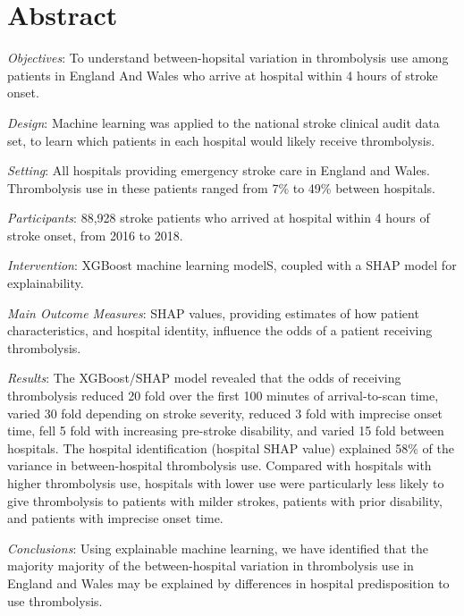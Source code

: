 \section*{Abstract}

\emph{Objectives}: To understand between-hopsital variation in thrombolysis use among patients in England And Wales who arrive at hospital within 4 hours of stroke onset.

\emph{Design}: Machine learning was applied to the national stroke clinical audit data set, to learn which patients in each hospital would likely receive thrombolysis.

\emph{Setting}: All hospitals providing emergency stroke care in England and Wales. Thrombolysis use in these patients ranged from 7\% to 49\% between hospitals.

\emph{Participants}: 88,928 stroke patients who arrived at hospital within 4 hours of stroke onset, from 2016 to 2018.

\emph{Intervention}: XGBoost machine learning modelS, coupled with a SHAP model for explainability.

\emph{Main Outcome Measures}: SHAP values, providing estimates of how patient characteristics, and hospital identity, influence the odds of a patient receiving thrombolysis.

\emph{Results}: The XGBoost/SHAP model revealed that the odds of receiving thrombolysis reduced 20 fold over the first 100 minutes of arrival-to-scan time, varied 30 fold depending on stroke severity, reduced 3 fold with imprecise onset time, fell 5 fold with increasing pre-stroke disability, and varied 15 fold between hospitals. The hospital identification (hospital SHAP value) explained 58\% of the variance in between-hospital thrombolysis use. Compared with hospitals with higher thrombolysis use, hospitals with lower use were particularly less likely to give thrombolysis to patients with milder strokes, patients with prior disability, and patients with imprecise onset time.

\emph{Conclusions}: Using explainable machine learning, we have identified that the majority majority of the between-hospital variation in thrombolysis use in England and Wales may be explained by differences in hospital predisposition to use thrombolysis.
